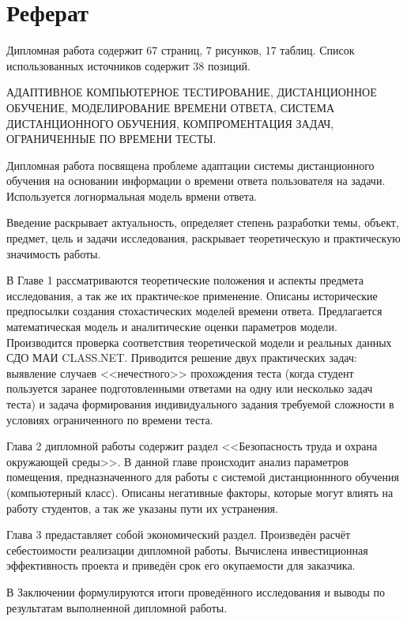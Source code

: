 \section*{Реферат}

Дипломная работа содержит 67 страниц, 7 рисунков, 17 таблиц. Список использованных источников содержит 38 позиций.

{
\vspace{0.5cm}
АДАПТИВНОЕ КОМПЬЮТЕРНОЕ ТЕСТИРОВАНИЕ, ДИСТАНЦИ\-ОННОЕ ОБУЧЕНИЕ, МОДЕЛИРОВАНИЕ ВРЕМЕНИ ОТВЕТА, СИСТЕ\-МА ДИСТАНЦИОННОГО ОБУЧЕНИЯ, КОМПРОМЕНТАЦИЯ ЗАДАЧ, ОГРАНИЧЕННЫЕ ПО ВРЕМЕНИ ТЕСТЫ.
\vspace{0.5cm}
}

Дипломная работа посвящена проблеме адаптации системы дистанционного обучения на основании информации о времени ответа пользователя на задачи. Используется логнормальная модель врмени ответа.

Введение раскрывает актуальность, определяет степень разра\-ботки темы, объект, предмет,  цель и задачи исследования, раскрывает теоре\-тическую и прак\-тическую значимость работы.

В Главе 1 рассматриваются теоретические положения и аспекты предмета исследования, а так же их практичеcкое применение. Описаны исторические предпосылки создания стохастических моделей времени ответа. Предлагается математическая модель и аналитические оценки параметров модели. Произ\-водится проверка соответствия теоретической модели и реальных данных СДО МАИ CLASS.NET. Приводится решение двух прак\-тических задач: вы\-явление случаев <<нечестного>> прохождения  теста (когда студент пользуется заранее подготовленными ответами на одну или несколько задач теста) и задача формирования индивидуального задания требуемой сложности в ус\-ловиях ограниченного по времени теста.

Глава 2 дипломной работы содержит раздел <<Безопасность труда и охрана окружающей среды>>. В данной главе проис\-ходит анализ параметров поме\-щения, предназначенного для работы с сис\-темой ди\-станционнного обучения (компьютерный класс). Описаны негативные факторы, которые могут влиять на работу студентов, а так же указаны пути их устранения. 

Глава 3 предаставляет собой экономичес\-кий раздел. Произведён расчёт себестоимости реализации дипломной работы. Вычислена инвести\-ционная эффективность проекта и приведён срок его окупаемости для заказчика.

В Заключе\-нии формулируются итоги проведённого исследования и выводы по результатам выполненной дипломной работы.
